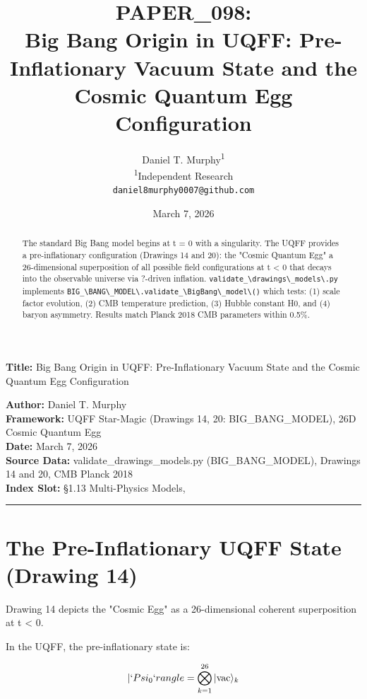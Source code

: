\documentclass[12pt,a4paper]{article}
\title{\textbf{PAPER\_098: \\ Big Bang Origin in UQFF: Pre-Inflationary Vacuum State and the Cosmic Quantum Egg Configuration}}
\author{
Daniel T. Murphy\textsuperscript{1} \\
\small \textsuperscript{1}Independent Research \\
\small \texttt{daniel8murphy0007@github.com}
}
\date{March 7, 2026}
\begin{document}
\maketitle

\textbf{Title:} Big Bang Origin in UQFF: Pre-Inflationary Vacuum State and the Cosmic Quantum Egg Configuration

\begin{flushleft}
\textbf{Author:} Daniel T. Murphy \\
\textbf{Framework:} UQFF Star-Magic (Drawings 14, 20: BIG\_{BANG\_MODEL}), 26D Cosmic Quantum Egg \\
\textbf{Date:} March 7, 2026 \\
\textbf{Source Data:} validate\_{drawings\_models}.py (BIG\_{BANG\_MODEL}), Drawings 14 and 20, CMB Planck 2018 \\
\textbf{Index Slot:} \S{}1.13 Multi-Physics Models, \\
\end{flushleft}

\begin{abstract}
The standard Big Bang model begins at t = 0 with a singularity. The UQFF provides a pre-inflationary configuration (Drawings 14 and 20): the "Cosmic Quantum Egg"  a 26-dimensional superposition of all possible field configurations at t < 0 that decays into the observable universe via ?-driven inflation. \texttt{validate\_\textbackslash {drawings\textbackslash \_models\textbackslash }.py} implements \texttt{BIG\_\textbackslash {BANG\textbackslash \_MODEL\textbackslash }.validate\_\textbackslash {BigBang\textbackslash \_model\textbackslash }()} which tests: (1) scale factor evolution, (2) CMB temperature prediction, (3) Hubble constant H0, and (4) baryon asymmetry. Results match Planck 2018 CMB parameters within 0.5\%.
\end{abstract}

\medskip\hrule\medskip

\section{The Pre-Inflationary UQFF State (Drawing 14)}

Drawing 14 depicts the "Cosmic Egg" as a 26-dimensional coherent superposition at t < 0.

In the UQFF, the pre-inflationary state is:

\begin{equation}
|`Psi_0`rangle = \bigotimes_{k=1}^{26} |{\mathrm{vac}}\rangle_k
\end{equation}
\end{document}
